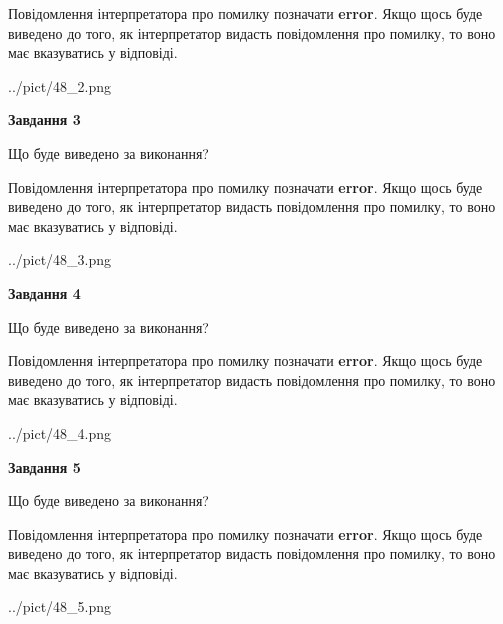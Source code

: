 \documentclass[12pt, ukrainian]{article}
\begin{document}
{\begin {large}
Повідомлення інтерпретатора про помилку позначати \textbf{error}.
Якщо щось буде виведено до того, як інтерпретатор видасть повідомлення про помилку, 
то воно має вказуватись у відповіді. \par


\begin{center}
	{../pict/48_2.png}
\end{center}
\newpage

{\begin {center}\textbf{Завдання 3}\end {center}}\par
Що буде виведено за виконання?

Повідомлення інтерпретатора про помилку позначати \textbf{error}.
Якщо щось буде виведено до того, як інтерпретатор видасть повідомлення про помилку, 
то воно має вказуватись у відповіді. \par


\begin{center}
	{../pict/48_3.png}
\end{center}
\newpage

{\begin {center}\textbf{Завдання 4}\end {center}}\par
Що буде виведено за виконання?

Повідомлення інтерпретатора про помилку позначати \textbf{error}.
Якщо щось буде виведено до того, як інтерпретатор видасть повідомлення про помилку, 
то воно має вказуватись у відповіді. \par


\begin{center}
	{../pict/48_4.png}
\end{center}
\newpage

{\begin {center}\textbf{Завдання 5}\end {center}}\par
Що буде виведено за виконання?

Повідомлення інтерпретатора про помилку позначати \textbf{error}.
Якщо щось буде виведено до того, як інтерпретатор видасть повідомлення про помилку, 
то воно має вказуватись у відповіді. \par


\begin{center}
	{../pict/48_5.png}
\end{center}
\newpage


\end{large}}
\end{document}
